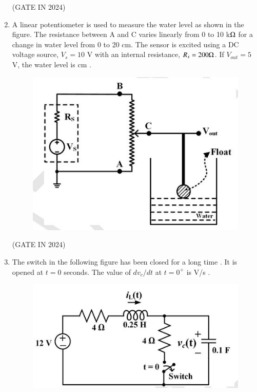 \documentclass[journal,12pt,onecolumn]{IEEEtran}
\theoremstyle{remark}
\begin{document}
\begin{enumerate}
    \hfill{(GATE IN 2024)}

    \item A linear potentiometer  is used to measure the water level as shown in the figure. The resistance between A and C varies linearly from 0 to 10 k$\ohm$ for a change in water level from 0 to 20 cm. The sensor is excited using a DC voltage source, $V_s = 10$ V with an internal resistance, $R_s = 200 \ohm$. If $V_{out} = 5$ V, the water level is \underline{\hspace{2cm}} cm .
    \begin{figure}[H]
        \centering
        \includegraphics[width=0.6\columnwidth]{figs/p14.jpg}
        \caption*{}
        \label{fig:p14}
    \end{figure}
    
    \hfill{(GATE IN 2024)}
    
    \item The switch in the following figure has been closed for a long time . It is opened at $t = 0$ seconds. The value of $dv_c/dt$ at $t = 0^+$ is \underline{\hspace{2cm}} V/s .
    \begin{figure}[H]
        \centering
        \includegraphics[width=0.7\columnwidth]{figs/p15.jpg}
        \caption*{}
        \label{fig:p15}
    \end{figure}
    

\end{enumerate}
\end{document}
